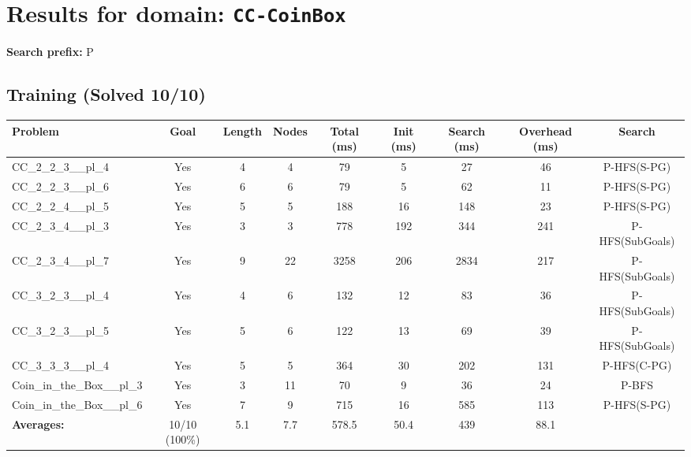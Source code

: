 \documentclass{article}
\begin{document}
\section*{Results for domain: \texttt{CC-CoinBox}}
\textbf{Search prefix:} P
\\[0.5cm]
\subsection*{Training (Solved 10/10)}
\begin{tabular}{lcccccccc}
\toprule
Problem & Goal & Length & Nodes & Total (ms) & Init (ms) & Search (ms) & Overhead (ms) & Search \\
\midrule
CC\_2\_2\_3\_\_pl\_4 & Yes & 4 & 4 & 79 & 5 & 27 & 46 & P-HFS(S-PG) \\
CC\_2\_2\_3\_\_pl\_6 & Yes & 6 & 6 & 79 & 5 & 62 & 11 & P-HFS(S-PG) \\
CC\_2\_2\_4\_\_pl\_5 & Yes & 5 & 5 & 188 & 16 & 148 & 23 & P-HFS(S-PG) \\
CC\_2\_3\_4\_\_pl\_3 & Yes & 3 & 3 & 778 & 192 & 344 & 241 & P-HFS(SubGoals) \\
CC\_2\_3\_4\_\_pl\_7 & Yes & 9 & 22 & 3258 & 206 & 2834 & 217 & P-HFS(SubGoals) \\
CC\_3\_2\_3\_\_pl\_4 & Yes & 4 & 6 & 132 & 12 & 83 & 36 & P-HFS(SubGoals) \\
CC\_3\_2\_3\_\_pl\_5 & Yes & 5 & 6 & 122 & 13 & 69 & 39 & P-HFS(SubGoals) \\
CC\_3\_3\_3\_\_pl\_4 & Yes & 5 & 5 & 364 & 30 & 202 & 131 & P-HFS(C-PG) \\
Coin\_in\_the\_Box\_\_pl\_3 & Yes & 3 & 11 & 70 & 9 & 36 & 24 & P-BFS \\
Coin\_in\_the\_Box\_\_pl\_6 & Yes & 7 & 9 & 715 & 16 & 585 & 113 & P-HFS(S-PG) \\
\textbf{Averages:} & 10/10 (100\%) & 5.1 & 7.7 & 578.5 & 50.4 & 439 & 88.1 & \\
\bottomrule
\end{tabular}
\\[0.7cm]
\end{document}
